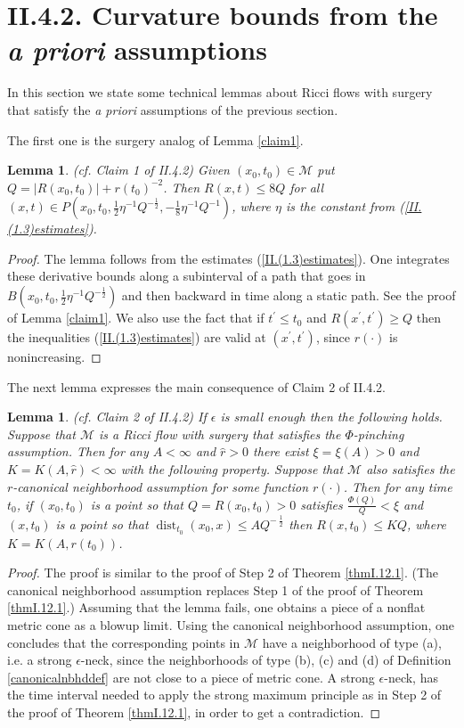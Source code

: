 \documentclass[12pt]{amsart}
\newcommand{\dist}{\operatorname{dist}}
\newcommand{\M}{{\mathcal M}}
\numberwithin{equation}{section}
\theoremstyle{plain}
\newtheorem{lemma}[equation]{Lemma}
\theoremstyle{definition}
\theoremstyle{remark}
\begin{document}
\section{II.4.2. Curvature bounds from the {\it a priori} assumptions}

In this section we state some technical lemmas about Ricci flows with surgery
that satisfy the {\em {\it a priori}} assumptions of the previous section.

The first one is the surgery 
analog of  Lemma \ref{claim1}.

\begin{lemma}(cf. Claim 1 of II.4.2)
\label{claim1II.4.2}
Given $(x_0,t_0)\in\M$ put $Q = |R(x_0,t_0)|+r(t_0)^{-2}$.
Then $R(x,t)\leq 8Q$ for all 
$(x,t) \in P(x_0,t_0,\frac12\eta^{-1}Q^{-\frac12},
-\frac18\eta^{-1}Q^{-1})$, where $\eta$ is the constant from
(\ref{II.(1.3)estimates}).
\end{lemma}
\begin{proof}
The lemma follows from the estimates (\ref{II.(1.3)estimates}).
One integrates these derivative bounds along a subinterval of
a path that goes 
in $B(x_0,t_0,\frac12\eta^{-1}Q^{-\frac12})$ and then
backward in time along a static path. See the proof of
Lemma \ref{claim1}.
We also use the fact that if $t^\prime \le t_0$ and 
$R(x^\prime, t^\prime) \ge Q$ then the inequalities
(\ref{II.(1.3)estimates}) are valid at $(x^\prime, t^\prime)$,
since $r(\cdot)$ is nonincreasing.
\end{proof}

The next lemma expresses the main consequence of
Claim 2 of II.4.2. 

\begin{lemma}(cf. Claim 2 of II.4.2)
\label{claim2II.4.2}
If $\epsilon$ is small enough then the following holds.
Suppose that $\M$ is a Ricci flow with surgery that satisfies the
$\Phi$-pinching assumption.
Then for any $A<\infty$ and $\widehat{r} > 0$ there exist 
$\xi=\xi(A) > 0$ and $K=K(A,\widehat{r}) < \infty$
with the following property. 
Suppose that $\M$ also satisfies the $r$-canonical neighborhood assumption
for some function $r(\cdot)$.
Then for any time $t_0$, if
$(x_0,t_0)$ is a point so that $Q = R(x_0,t_0) > 0$ satisfies
$\frac{\Phi(Q)}{Q} < \xi$
and $(x, t_0)$ is a point so that
$\dist_{t_0}(x_0, x) \le A Q^{- \: \frac12}$ then $R(x, t_0) \le KQ$,
where $K = K(A, r(t_0))$.
\end{lemma}
\begin{proof}
The proof is similar to the  proof of Step 2 of Theorem
\ref{thmI.12.1}. 
(The canonical neighborhood assumption
replaces Step 1 of the proof of Theorem \ref{thmI.12.1}.)
Assuming that the lemma fails, one obtains a
piece of a nonflat metric cone as a blowup limit.
Using the canonical neighborhood assumption, one concludes
that the corresponding points in $\M$ 
have a neighborhood of type (a), i.e. a strong
$\epsilon$-neck, since
the neighborhoods of type (b), (c) and (d) of Definition 
\ref{canonicalnbhddef} are not close to a piece of metric
cone. A strong $\epsilon$-neck, has the time interval needed to apply
the strong maximum
principle as in Step 2 of the proof of Theorem \ref{thmI.12.1}, in
order to get a contradiction.
\end{proof}
\end{document}

